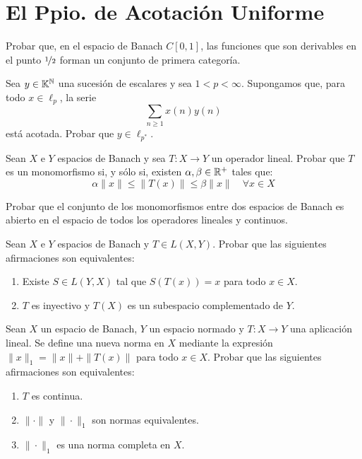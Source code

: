 \section{El Ppio. de Acotación Uniforme}

\begin{ejercicio}
Probar que, en el espacio de Banach $C\left[0, 1\right]$, las funciones que son derivables en el punto $\nicefrac{1}{2}$ forman un conjunto de primera categoría.
\end{ejercicio}

\begin{ejercicio}
Sea $y \in \mathbb{K}^{\mathbb{N}}$ una sucesión de escalares y sea $1 < p < \infty$. Supongamos que, para todo $x \in \ell_p$, la serie
\[
\sum_{n \geq 1} x(n)y(n)
\]
está acotada. Probar que $y \in \ell_{p^*}$.
\end{ejercicio}

\begin{ejercicio}
Sean $X$ e $Y$ espacios de Banach y sea $T: X \longrightarrow Y$ un operador lineal. Probar que $T$ es un monomorfismo si, y sólo si, existen $\alpha, \beta \in \mathbb{R}^+$ tales que:
\[
\alpha \|x\| \leq \|T(x)\| \leq \beta \|x\| \quad \forall x \in X
\]
\end{ejercicio}

\begin{ejercicio}
Probar que el conjunto de los monomorfismos entre dos espacios de Banach es abierto en el espacio de todos los operadores lineales y continuos.
\end{ejercicio}

\begin{ejercicio}
Sean $X$ e $Y$ espacios de Banach y $T \in L(X, Y)$. Probar que las siguientes afirmaciones son equivalentes:
\begin{enumerate}[label=\textbf{\alph*)}]
    \item Existe $S \in L(Y, X)$ tal que $S(T(x)) = x$ para todo $x \in X$.
    \item $T$ es inyectivo y $T(X)$ es un subespacio complementado de $Y$.
\end{enumerate}
\end{ejercicio}

\begin{ejercicio}
Sean $X$ un espacio de Banach, $Y$ un espacio normado y $T: X \longrightarrow Y$ una aplicación lineal. Se define una nueva norma en $X$ mediante la expresión $\|x\|_1 = \|x\| + \|T(x)\|$ para todo $x \in X$. Probar que las siguientes afirmaciones son equivalentes:
\begin{enumerate}[label=\textbf{\alph*)}]
    \item $T$ es continua.
    \item $\|\cdot\|$ y $\|\cdot\|_1$ son normas equivalentes.
    \item $\|\cdot\|_1$ es una norma completa en $X$.
\end{enumerate}
\end{ejercicio}


